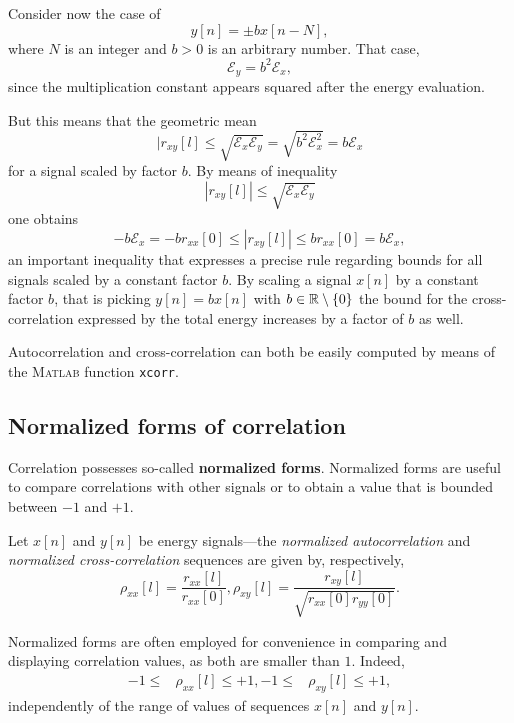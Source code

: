 \documentclass[\documentfontsize, twocolumn]{\classname}
\begin{document}
Consider now the case of \[y[n] = \pm b x[n-N],\] where $N$ is an integer and $b>0$ is an arbitrary number. That case, \[\mathcal E_y = b^2\mathcal E_x,\] since the multiplication constant appears squared after the energy evaluation.

But this means that the geometric mean \[|r_{xy}[l] \leq \sqrt{\mathcal E_x \mathcal E_y} = \sqrt{b^2 \mathcal E^2_x} = b\mathcal E_x\] for a signal scaled by factor $b$. By means of inequality
\[
    |r_{xy}[l]| \leq \sqrt{\mathcal E_x \mathcal E_y}
\]
one obtains
\begin{equation}\label{eqn:crossCorrelationScalingBounds}
- b \mathcal E_x = - br_{xx}[0]  \leq |r_{xy}[l]| \leq b r_{xx}[0] = b \mathcal E_x,
\end{equation}
an important inequality that expresses a precise rule regarding bounds for all signals scaled by a constant factor $b$. By scaling a signal $x[n]$ by a constant factor $b$, that is picking $y[n] = bx[n]$ with $b\in\mathbb R\setminus\{0\}$ the bound for the cross-correlation expressed by the total energy increases by a factor of $b$ as well.

Autocorrelation and cross-correlation can both be easily computed by means of the \textsc{Matlab} function \texttt{xcorr}.

\subsection{Normalized forms of correlation}

Correlation possesses so-called \textbf{normalized forms}. Normalized forms are useful to compare correlations with other signals or to obtain a value that is bounded between $-1$ and $+1$.

\begin{defin}
    Let $x[n]$ and $y[n]$ be energy signals---the \emph{normalized autocorrelation} and \emph{normalized cross-correlation} sequences are given by, respectively,
    \begin{equation}\label{eqn:normalizedCorrelationFormulas}
        \rho_{xx}[l] = \frac{r_{xx}[l]}{r_{xx}[0]}, \rho_{xy}[l]=\frac{r_{xy}[l]}{\sqrt{r_{xx}[0]r_{yy}[0]}}.
    \end{equation}
\end{defin}

Normalized forms are often employed for convenience in comparing and displaying correlation values, as both are smaller than $1$. Indeed,
\begin{align*}
    -1 \leq &\rho_{xx}[l] \leq +1,
    -1 \leq &\rho_{xy}[l] \leq +1,
\end{align*}
independently of the range of values of sequences $x[n]$ and $y[n]$.
\end{document}
